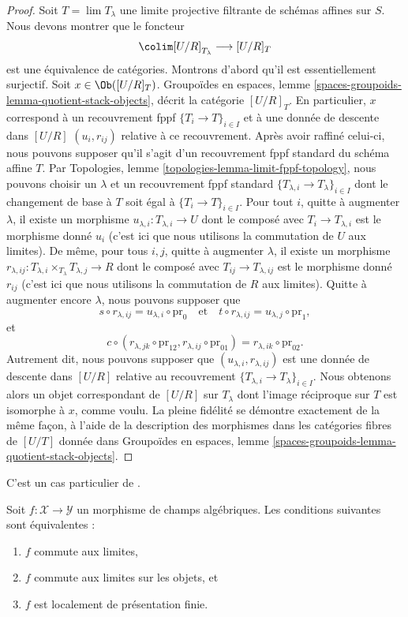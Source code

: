 \begin{proof}
\medskip\noindent
Soit $T = \lim T_\lambda$ une limite projective filtrante de schémas affines
sur $S$. Nous devons montrer que le foncteur
$$
\colim [U/R]_{T_\lambda} \longrightarrow [U/R]_T
$$
est une équivalence de catégories. Montrons d'abord qu'il est essentiellement
surjectif. Soit $x \in \Ob([U/R]_T)$. Groupoïdes en espaces, lemme
\ref{spaces-groupoids-lemma-quotient-stack-objects}, décrit la catégorie
$[U/R]_T$. En particulier, $x$ correspond à un recouvrement fppf
$\{T_i \to T\}_{i \in I}$ et à une donnée de descente dans $[U/R]$
$(u_i, r_{ij})$ relative à ce recouvrement. Après avoir raffiné celui-ci, nous
pouvons supposer qu'il s'agit d'un recouvrement fppf standard du schéma affine
$T$. Par Topologies, lemme \ref{topologies-lemma-limit-fppf-topology}, nous
pouvons choisir un $\lambda$ et un recouvrement fppf standard
$\{T_{\lambda, i} \to T_\lambda\}_{i \in I}$ dont le changement de base à
$T$ soit égal à $\{T_i \to T\}_{i \in I}$. Pour tout $i$, quitte à augmenter
$\lambda$, il existe un morphisme $u_{\lambda, i} : T_{\lambda, i} \to U$
dont le composé avec $T_i \to T_{\lambda, i}$ est le morphisme donné $u_i$
(c'est ici que nous utilisons la commutation de $U$ aux limites). De même,
pour tous $i, j$, quitte à augmenter $\lambda$, il existe un morphisme
$r_{\lambda, ij} : T_{\lambda, i} \times_{T_\lambda} T_{\lambda, j} \to R$
dont le composé avec $T_{ij} \to T_{\lambda, ij}$ est le morphisme donné
$r_{ij}$ (c'est ici que nous utilisons la commutation de $R$ aux limites).
Quitte à augmenter encore $\lambda$, nous pouvons supposer que
$$
s \circ r_{\lambda, ij} = u_{\lambda, i} \circ \text{pr}_0
\quad\text{et}\quad
t \circ r_{\lambda, ij} = u_{\lambda, j} \circ \text{pr}_1,
$$
et
$$
c \circ (r_{\lambda, jk} \circ \text{pr}_{12}, r_{\lambda, ij}
\circ \text{pr}_{01}) = r_{\lambda, ik} \circ \text{pr}_{02}.
$$
Autrement dit, nous pouvons supposer que
$(u_{\lambda, i}, r_{\lambda, ij})$ est une donnée de descente dans $[U/R]$
relative au recouvrement
$\{T_{\lambda, i} \to T_\lambda\}_{i \in I}$. Nous obtenons alors un objet
correspondant de $[U/R]$ sur $T_\lambda$ dont l'image réciproque sur $T$ est
isomorphe à $x$, comme voulu. La pleine fidélité se démontre exactement de la
même façon, à l'aide de la description des morphismes dans les catégories
fibres de $[U/T]$ donnée dans Groupoïdes en espaces, lemme
\ref{spaces-groupoids-lemma-quotient-stack-objects}.
\end{proof}

\begin{proposition}
\label{proposition-characterize-locally-finite-presentation}
\begin{reference}
C'est un cas particulier de \cite[Lemme 2.3.15]{Emerton-Gee}.
\end{reference}
Soit $f : \mathcal{X} \to \mathcal{Y}$ un morphisme de champs algébriques.
Les conditions suivantes sont équivalentes :
\begin{enumerate}
\item $f$ commute aux limites,
\item $f$ commute aux limites sur les objets, et
\item $f$ est localement de présentation finie.
\end{enumerate}
\end{proposition}

